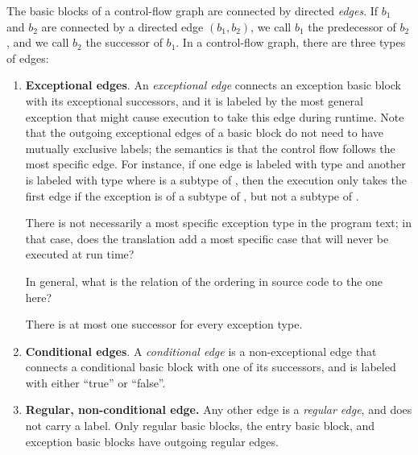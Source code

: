 \begin{definition}
\label{def:edges}
The basic blocks of a control-flow graph are connected by directed
\emph{edges}.  If $b_1$ and $b_2$ are connected by a directed edge
$(b_1,b_2)$, we call $b_1$ the predecessor of $b_2$, and we call $b_2$
the successor of $b_1$.  In a control-flow graph, there are three
types of edges:
\begin{enumerate}
    \item \textbf{Exceptional edges}. An \emph{exceptional edge}
      connects an exception basic block with its exceptional
      successors, and it is labeled by the most general exception that
      might cause execution to take this edge during runtime.  Note
      that the outgoing exceptional edges of a basic block do not need
      to have mutually exclusive labels; the semantics is that the
      control flow follows the most specific edge. For instance, if
      one edge is labeled with type  and another is labeled
      with type  where  is a subtype of , then
      the execution only takes the first edge if the exception is of a
      subtype of , but not a subtype of .

\begin{workinprogress}
There is not necessarily a most specific exception type in the program
text; in that case, does the translation add a most specific case that will
never be executed at run time?

In general, what is the relation of the ordering in source code to the
one here?
\end{workinprogress}

    There is at most one successor for every exception type.

    \item \textbf{Conditional edges}. A \emph{conditional edge} is a
      non-exceptional edge that connects a conditional basic block
      with one of its successors, and is labeled with either ``true''
      or ``false''.

    \item \textbf{Regular, non-conditional edge.} Any other edge is a
      \emph{regular edge}, and does not carry a label. Only regular
      basic blocks, the entry basic block, and exception basic blocks
      have outgoing regular edges.
\end{enumerate}
\end{definition}


